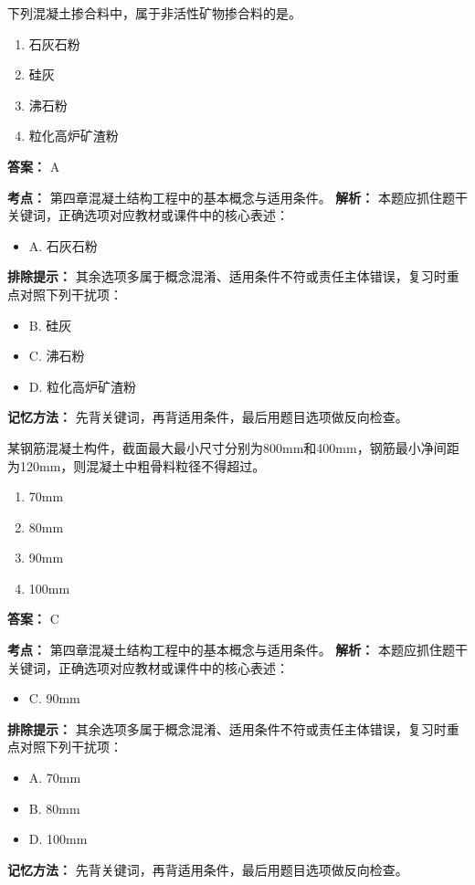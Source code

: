 \documentclass[UTF8,fontset=fandol,11pt]{ctexart}
\begin{document}
\begin{quizbox}[title={第 58 题}]
下列混凝土掺合料中，属于非活性矿物掺合料的是。\\
\begin{enumerate}[label=\Alph*.]
\item 石灰石粉
\item 硅灰
\item 沸石粉
\item 粒化高炉矿渣粉
\end{enumerate}
\textbf{答案：} A
\vspace{0.25em}
\begin{answerbox}[title={考点解析}]
\textbf{考点：} 第四章混凝土结构工程中的基本概念与适用条件。
\textbf{解析：} 本题应抓住题干关键词，正确选项对应教材或课件中的核心表述：
\begin{itemize}
\item A. 石灰石粉
\end{itemize}
\textbf{排除提示：} 其余选项多属于概念混淆、适用条件不符或责任主体错误，复习时重点对照下列干扰项：
\begin{itemize}
\item B. 硅灰
\item C. 沸石粉
\item D. 粒化高炉矿渣粉
\end{itemize}
\textbf{记忆方法：} 先背关键词，再背适用条件，最后用题目选项做反向检查。
\end{answerbox}
\end{quizbox}

\begin{quizbox}[title={第 59 题}]
某钢筋混凝土构件，截面最大最小尺寸分别为800mm和400mm，钢筋最小净间距为120mm，则混凝土中粗骨料粒径不得超过。\\
\begin{enumerate}[label=\Alph*.]
\item 70mm
\item 80mm
\item 90mm
\item 100mm
\end{enumerate}
\textbf{答案：} C
\vspace{0.25em}
\begin{answerbox}[title={考点解析}]
\textbf{考点：} 第四章混凝土结构工程中的基本概念与适用条件。
\textbf{解析：} 本题应抓住题干关键词，正确选项对应教材或课件中的核心表述：
\begin{itemize}
\item C. 90mm
\end{itemize}
\textbf{排除提示：} 其余选项多属于概念混淆、适用条件不符或责任主体错误，复习时重点对照下列干扰项：
\begin{itemize}
\item A. 70mm
\item B. 80mm
\item D. 100mm
\end{itemize}
\textbf{记忆方法：} 先背关键词，再背适用条件，最后用题目选项做反向检查。
\end{answerbox}
\end{quizbox}
\end{document}

